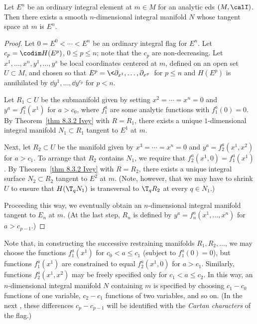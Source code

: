 \begin{thm}\label{thm 8.3.3 Ivey}
    Let $E^n$ be an ordinary integral element at $m\in M$ for an analytic \gls{eds} $(M,\calI)$. Then there exists a smooth $n$-dimensional integral manifold $N$ whose tangent space at $m$ is $E^n$.
\end{thm}
\begin{proof}
    Let $0=E^0<\cdots<E^n$ be an ordinary integral flag for $E^n$. Let $c_p=\codim H(E^p)$, $0\leq p\leq n$; note that the $c_p$ are non-decreasing. Let $x^1,\ldots,x^n,y^1,\ldots,y^s$ be local coordinates centered at $m$, defined on an open set $U\subset M$, and chosen so that $E^p=\<\partial_{x^1},\ldots,\partial_{x^p}\>$ for $p\leq n$ and $H(E^p)$ is annihilated by $\dd y^1,\ldots,\dd y^{c_p}$ for $p<n$.

    Let $R_1\subset U$ be the submanifold given by setting $x^2=\cdots =x^n=0$ and $y^a=f_1^a(x^1)$ for $a>c_0$, where $f_1^a$ are some analytic functions with $f_1^a(0)=0$. By Theorem~\ref{thm 8.3.2 Ivey} with $R=R_1$, there exists a unique $1$-dimensional integral manifold $N_1\subset R_1$ tangent to $E^1$ at $m$.

    Next, let $R_2\subset U$ be the manifold given by $x^3=\cdots =x^n=0$ and $y^a=f_2^a(x^1,x^2)$ for $a>c_1$. To arrange that $R_2$ contains $N_1$, we require that $f_2^a(x^1,0)=f_1^a(x^1)$. By Theorem~\ref{thm 8.3.2 Ivey} with $R=R_2$, there exists a unique integral surface $N_2\subset R_2$ tangent to $E^2$ at $m$. (Note, however, that we may have to shrink $U$ to ensure that $H(\T_q N_1)$ is transversal to $\T_q R_2$ at every $q\in N_1$.)

    Proceeding this way, we eventually obtain an $n$-dimensional integral manifold tangent to $E_n$ at $m$. (At the last step, $R_n$ is defined by $y^a=f_n^a(x^1,\ldots,x^n)$ for $a>c_{p-1}$.)
\end{proof}

\begin{rem}\label{rem 8.3.4 Ivey}
    Note that, in constructing the successive restraining manifolds $R_1,R_2,\ldots$, we may choose the functions $f_1^a(x^1)$ for $c_0< a\leq c_1$ (subject to $f_1^a(0)=0$), but functions $f_1^a(x^1)$ are constrained to equal $f_2^a(x^1,0)$ for $a>c_1$. Similarly, functions $f_2^a(x^1,x^2)$ may be freely specified only for $c_1<a\leq c_2$. In this way, an $n$-dimensional integral manifold $N$ containing $m$ is specified by choosing $c_1-c_0$ functions of one variable, $c_2-c_1$ functions of two variables, and so on. (In the next \sect, these differences $c_p-c_{p-1}$ will be identified with the \emph{Cartan characters} of the flag.)
\end{rem}


